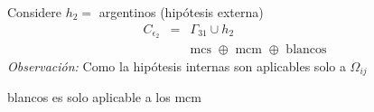 \documentclass[]{article}
\begin{document}
Considere $h_2=$ argentinos (hip\'otesis externa)
\begin{eqnarray*}
	C_{\epsilon_2}&=&\Gamma_{31}\cup  h_2 \\
	& &\text{mcs $\oplus$ mcm $\oplus$ blancos}
\end{eqnarray*}
\emph{Observaci\'on:} Como la hip\'otesis internas son aplicables solo  a $\Omega_{ij}$ 
blancos es solo aplicable a los mcm
\end{document}
